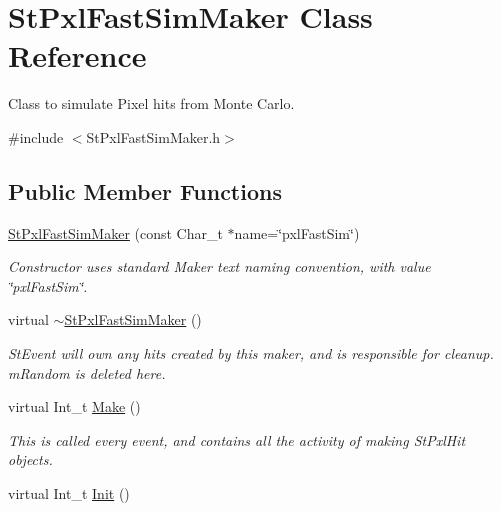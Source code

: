 \hypertarget{classStPxlFastSimMaker}{\section{St\-Pxl\-Fast\-Sim\-Maker Class Reference}
\label{classStPxlFastSimMaker}
}


Class to simulate Pixel hits from Monte Carlo.  




{\ttfamily \#include $<$St\-Pxl\-Fast\-Sim\-Maker.\-h$>$}

\subsection*{Public Member Functions}
\begin{DoxyCompactItemize}
\item 
\hypertarget{classStPxlFastSimMaker_ad143ec1535f8ee8df749240970902762}{\hyperlink{classStPxlFastSimMaker_ad143ec1535f8ee8df749240970902762}{St\-Pxl\-Fast\-Sim\-Maker} (const Char\-\_\-t $\ast$name=\char`\"{}pxl\-Fast\-Sim\char`\"{})}\label{classStPxlFastSimMaker_ad143ec1535f8ee8df749240970902762}

\begin{DoxyCompactList}\small\item\em Constructor uses standard Maker text naming convention, with value \char`\"{}pxl\-Fast\-Sim\char`\"{}. \end{DoxyCompactList}\item 
\hypertarget{classStPxlFastSimMaker_aaad93342b65e4f0ef8b64e54ab9c9e7f}{virtual \hyperlink{classStPxlFastSimMaker_aaad93342b65e4f0ef8b64e54ab9c9e7f}{$\sim$\-St\-Pxl\-Fast\-Sim\-Maker} ()}\label{classStPxlFastSimMaker_aaad93342b65e4f0ef8b64e54ab9c9e7f}

\begin{DoxyCompactList}\small\item\em St\-Event will own any hits created by this maker, and is responsible for cleanup. m\-Random is deleted here. \end{DoxyCompactList}\item 
virtual Int\-\_\-t \hyperlink{classStPxlFastSimMaker_a65de518a13e021f32a81fa3dfbe7d9c1}{Make} ()
\begin{DoxyCompactList}\small\item\em This is called every event, and contains all the activity of making St\-Pxl\-Hit objects. \end{DoxyCompactList}\item 
\hypertarget{classStPxlFastSimMaker_af9f49bc6d5f109401cd46d3e888029df}{virtual Int\-\_\-t \hyperlink{classStPxlFastSimMaker_af9f49bc6d5f109401cd46d3e888029df}{Init} ()}\label{classStPxlFastSimMaker_af9f49bc6d5f109401cd46d3e888029df}


\end{DoxyCompactItemize}

